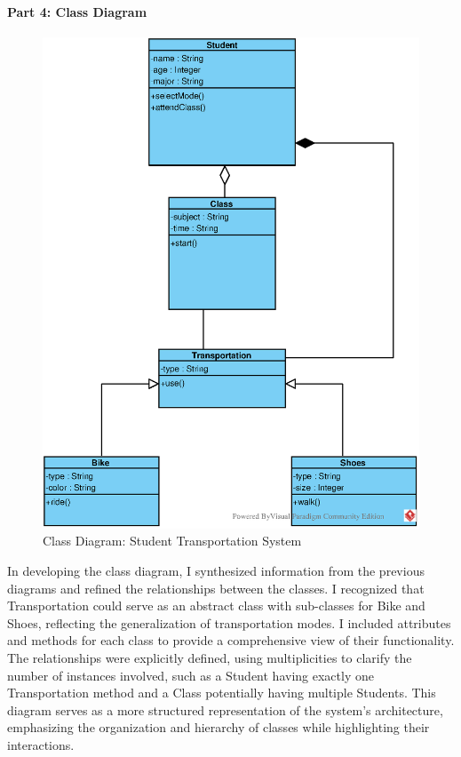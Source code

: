 \paragraph*{Part 4: Class Diagram}
\begin{figure}[H]
    \centering
    \includegraphics[width=\textwidth]{images/EPS/ex3-5_part4.eps}
    \caption{Class Diagram: Student Transportation System}
    \label{fig:ex3-5_part4}
\end{figure}

In developing the class diagram, I synthesized information from the previous diagrams and refined the relationships between the classes. I recognized that Transportation could serve as an abstract class with sub-classes for Bike and Shoes, reflecting the generalization of transportation modes. I included attributes and methods for each class to provide a comprehensive view of their functionality. The relationships were explicitly defined, using multiplicities to clarify the number of instances involved, such as a Student having exactly one Transportation method and a Class potentially having multiple Students. This diagram serves as a more structured representation of the system's architecture, emphasizing the organization and hierarchy of classes while highlighting their interactions.

